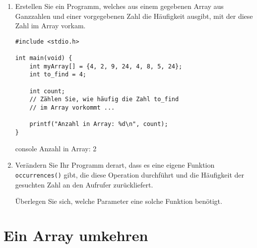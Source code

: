 \begin{enumerate}
  \item Erstellen Sie ein Programm, welches aus einem gegebenen Array aus
  Ganzzahlen und einer vorgegebenen Zahl die Häufigkeit ausgibt, mit der diese
  Zahl im Array vorkam.

\Vorlage
\begin{verbatim}
#include <stdio.h>

int main(void) {
    int myArray[] = {4, 2, 9, 24, 4, 8, 5, 24};
    int to_find = 4;

    int count;
    // Zählen Sie, wie häufig die Zahl to_find
    // im Array vorkommt ...

    printf("Anzahl in Array: %d\n", count);
}
\end{verbatim}

\begin{mybox}[Bildschirmausgabe]{console}
Anzahl in Array: 2
\end{mybox}

  \item Verändern Sie Ihr Programm derart, dass es eine eigene Funktion
  \texttt{occurrences()} gibt, die diese Operation durchführt und die
  Häufigkeit der gesuchten Zahl an den Aufrufer zurückliefert.

  Überlegen Sie sich, welche Parameter eine solche Funktion benötigt.

\end{enumerate}



\chapter{Ein Array umkehren}


